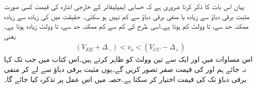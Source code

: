 یہاں اس بات کا ذکر کرنا ضروری ہے کہ حسابی ایمپلیفائر کے خارجی اشارہ کی قیمت کسی صورت مثبت برقی دباؤ  سے زیادہ یا منفی برقی دباؤ  سے کم نہیں ہو سکتی۔ حقیقت میں  کی زیادہ سے زیادہ ممکنہ حد سے، تا وولٹ کم ہوتا ہے۔اسی طرح کی کم سے کم ممکنہ حد    سے،   تا  وولٹ زیادہ ہوتا ہے۔یعنی
\begin{align}
\label{مساوات_حسابی_کے_خارجی_حدود}
(V_{EE} +\Delta_{-} )  <  v_o  < (V_{CC} -\Delta_{+})
\end{align}
اس مساوات میں  اور  ایک سے تین وولٹ کو ظاہر کرتے ہیں۔اس کتاب میں جب تک کہا نہ جائے ہم   اور   کی قیمت صفر تصور کریں گے۔یوں  مثبت برقی دباؤ  سے لے کر منفی برقی دباؤ تک کی قیمت اختیار کر سکتا ہے۔حصہ  میں اس عمل پر تذکرہ کیا جائے گا۔



